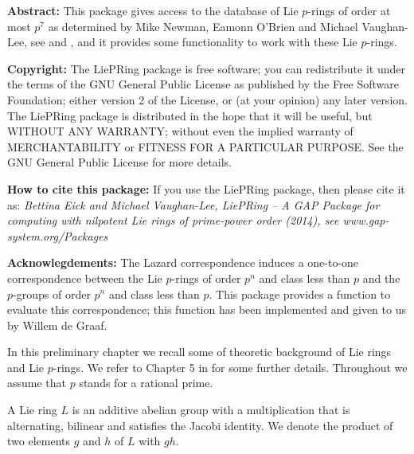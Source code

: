 

{\bf Abstract:}
This package gives access to the database of Lie $p$-rings of order at most 
$p^7$ as determined by Mike Newman, Eamonn O'Brien and Michael Vaughan-Lee, 
see \cite{NOV04} and \cite{OVL05}, and it provides some functionality to 
work with these Lie $p$-rings.
\bigskip

{\bf Copyright:}
The LiePRing package is free software; you can redistribute it under the 
terms of the GNU General Public License as published by the Free Software 
Foundation; either version 2 of the License, or (at your opinion) any 
later version. The LiePRing package is distributed in the hope that it will 
be useful, but WITHOUT ANY WARRANTY; without even the implied warranty of
MERCHANTABILITY or FITNESS FOR A PARTICULAR PURPOSE. See the GNU General 
Public License for more details.
\bigskip

{\bf How to cite this package:}
If you use the LiePRing package, then please cite it as:
{\it Bettina Eick and Michael Vaughan-Lee, LiePRing -- A GAP Package for
computing with nilpotent Lie rings of prime-power order (2014), see
www.gap-system.org/Packages}
\bigskip

{\bf Acknowlegdements:}
The Lazard correspondence induces a one-to-one correspondence between the
Lie $p$-rings of order $p^n$ and class less than $p$ and the $p$-groups of 
order $p^n$ and class less than $p$. This package provides a function to 
evaluate this correspondence; this function has been implemented and given
to us by Willem de Graaf. 


In this preliminary chapter we recall some of theoretic background
of Lie rings and Lie $p$-rings. We refer to Chapter 5 in \cite{Khu98} 
for some further details. Throughout we assume that $p$ stands for 
a rational prime.
\medskip

A Lie ring $L$ is an additive abelian group with a multiplication that
is alternating, bilinear and satisfies the Jacobi identity. We denote 
the product of two elements $g$ and $h$ of $L$ with $g h$.
\medskip

